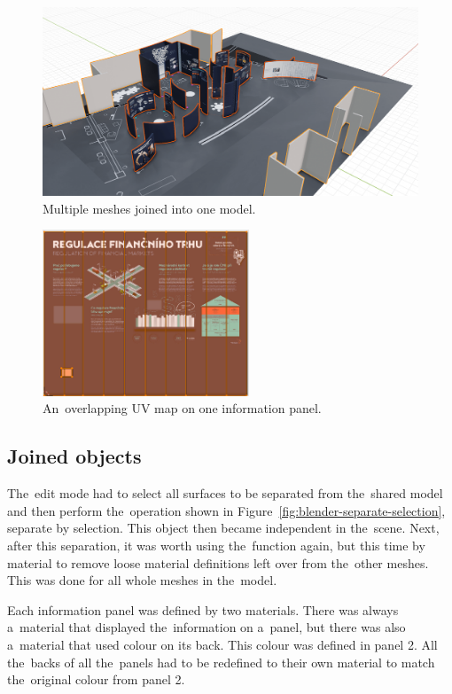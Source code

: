 \begin{figure}[!ht]\centering
    \includegraphics[width=\textwidth]{img/groupped-blender-models.png}
    \caption{Multiple meshes joined into one model.}
    \label{fig:blender-joined-objects}
\end{figure}

\begin{figure}[!ht]\centering
    \includegraphics[width=0.55\textwidth]{img/blender-overlapping-uv.png}
    \caption{An~overlapping UV map on one information panel.}
    \label{fig:blender-overlapping-uv}
\end{figure}

\subsection{Joined objects}
The~edit mode had to select all surfaces to be separated from the~shared model and then perform the~operation shown in Figure~\ref{fig:blender-separate-selection}, separate by selection. This object then became independent in the~scene. Next, after this separation, it was worth using the~function again, but this time by material to remove loose material definitions left over from the~other meshes. This was done for all whole meshes in the~model.

Each information panel was defined by two materials. There was always a~material that displayed the~information on a~panel, but there was also a~material that used colour on its back. This colour was defined in panel 2. All the~backs of all the~panels had to be redefined to their own material to match the~original colour from panel 2.

